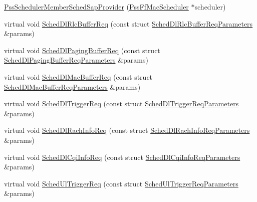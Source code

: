 \begin{DoxyCompactItemize}
\item 
\hyperlink{classns3_1_1PssSchedulerMemberSchedSapProvider_aecd981f15efb501bc6e2b19f1c514640}{Pss\+Scheduler\+Member\+Sched\+Sap\+Provider} (\hyperlink{classns3_1_1PssFfMacScheduler}{Pss\+Ff\+Mac\+Scheduler} $\ast$scheduler)
\item 
virtual void \hyperlink{classns3_1_1PssSchedulerMemberSchedSapProvider_a0082c7dd8144e8f59d041fb3049c5f8b}{Sched\+Dl\+Rlc\+Buffer\+Req} (const struct \hyperlink{structns3_1_1FfMacSchedSapProvider_1_1SchedDlRlcBufferReqParameters}{Sched\+Dl\+Rlc\+Buffer\+Req\+Parameters} \&params)
\item 
virtual void \hyperlink{classns3_1_1PssSchedulerMemberSchedSapProvider_a2204393c5ab4ba412d16aed87fbbe8c9}{Sched\+Dl\+Paging\+Buffer\+Req} (const struct \hyperlink{structns3_1_1FfMacSchedSapProvider_1_1SchedDlPagingBufferReqParameters}{Sched\+Dl\+Paging\+Buffer\+Req\+Parameters} \&params)
\item 
virtual void \hyperlink{classns3_1_1PssSchedulerMemberSchedSapProvider_a636d8217ba232f64324f3796f1bcc22b}{Sched\+Dl\+Mac\+Buffer\+Req} (const struct \hyperlink{structns3_1_1FfMacSchedSapProvider_1_1SchedDlMacBufferReqParameters}{Sched\+Dl\+Mac\+Buffer\+Req\+Parameters} \&params)
\item 
virtual void \hyperlink{classns3_1_1PssSchedulerMemberSchedSapProvider_a6c35084ffc11caac089fe1f156da7e3e}{Sched\+Dl\+Trigger\+Req} (const struct \hyperlink{structns3_1_1FfMacSchedSapProvider_1_1SchedDlTriggerReqParameters}{Sched\+Dl\+Trigger\+Req\+Parameters} \&params)
\item 
virtual void \hyperlink{classns3_1_1PssSchedulerMemberSchedSapProvider_a7c916db99f35c08e2169ec37a0cfc22d}{Sched\+Dl\+Rach\+Info\+Req} (const struct \hyperlink{structns3_1_1FfMacSchedSapProvider_1_1SchedDlRachInfoReqParameters}{Sched\+Dl\+Rach\+Info\+Req\+Parameters} \&params)
\item 
virtual void \hyperlink{classns3_1_1PssSchedulerMemberSchedSapProvider_a7558f96b0b3cfac7a1256f2f0ec2f9ad}{Sched\+Dl\+Cqi\+Info\+Req} (const struct \hyperlink{structns3_1_1FfMacSchedSapProvider_1_1SchedDlCqiInfoReqParameters}{Sched\+Dl\+Cqi\+Info\+Req\+Parameters} \&params)
\item 
virtual void \hyperlink{classns3_1_1PssSchedulerMemberSchedSapProvider_a70ebe11edecd1d19fd40e0fcb058b8ab}{Sched\+Ul\+Trigger\+Req} (const struct \hyperlink{structns3_1_1FfMacSchedSapProvider_1_1SchedUlTriggerReqParameters}{Sched\+Ul\+Trigger\+Req\+Parameters} \&params)

\end{DoxyCompactItemize}
